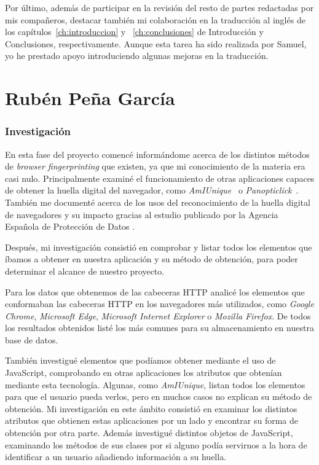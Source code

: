 Por último, además de participar en la revisión del resto de partes redactadas por mis compañeros, destacar también mi colaboración en la traducción al inglés de los capítulos~\ref{ch:introduccion} y ~\ref{ch:conclusiones} de Introducción y Conclusiones, respectivamente. Aunque esta tarea ha sido realizada por Samuel, yo he prestado apoyo introduciendo algunas mejoras en la traducción. \par


\section{Rubén Peña García}
\subsubsection{Investigación}
En esta fase del proyecto comencé informándome acerca de los distintos métodos de \textit{browser fingerprinting} que existen, ya que mi conocimiento de la materia era casi nulo. Principalmente examiné el funcionamiento de otras aplicaciones capaces de obtener la huella digital del navegador, como \textit{AmIUnique}~\cite{amiunique} o \textit{Panopticlick}~\cite{panop_paper}. También me documenté acerca de los usos del reconocimiento de la huella digital de navegadores y su impacto gracias al estudio publicado por la Agencia Española de Protección de Datos \cite{aepd}.\par
Después, mi investigación consistió en comprobar y listar todos los elementos que íbamos a obtener en nuestra aplicación y su método de obtención, para poder determinar el alcance de nuestro proyecto.\par
Para los datos que obtenemos de las cabeceras HTTP analicé los elementos que conformaban las cabeceras HTTP en los navegadores más utilizados, como \textit{Google Chrome}, \textit{Microsoft Edge}, \textit{Microsoft Internet Explorer} o \textit{Mozilla Firefox}. De todos los resultados obtenidos listé los más comunes para su almacenamiento en nuestra base de datos.\par
También investigué elementos que podíamos obtener mediante el uso de JavaScript, comprobando en otras aplicaciones los atributos que obtenían mediante esta tecnología. Algunas, como \textit{AmIUnique}, listan todos los elementos para que el usuario pueda verlos, pero en muchos casos no explican su método de obtención. Mi investigación en este ámbito consistió en examinar los distintos atributos que obtienen estas aplicaciones por un lado y encontrar su forma de obtención por otra parte. Además investigué distintos objetos de JavaScript, examinando los métodos de sus clases por si alguno podía servirnos a la hora de identificar a un usuario añadiendo información a su huella.
